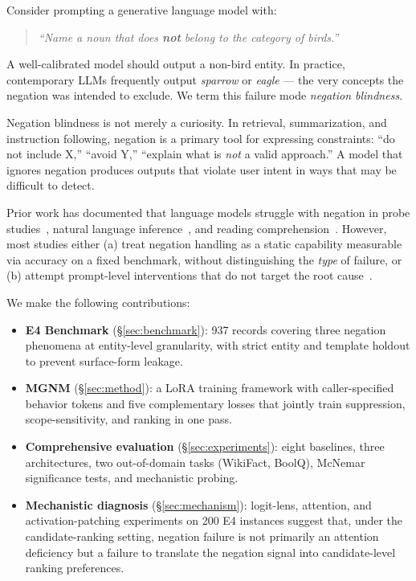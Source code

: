 \documentclass[letterpaper]{article}
\begin{document}
Consider prompting a generative language model with:
\begin{quote}
  \emph{``Name a noun that does \textbf{not} belong to the category of birds.''}
\end{quote}
A well-calibrated model should output a non-bird entity.
In practice, contemporary LLMs frequently output
\emph{sparrow} or \emph{eagle} --- the very concepts the negation was intended
to exclude.
We term this failure mode \emph{negation blindness}.

Negation blindness is not merely a curiosity.
In retrieval, summarization, and instruction following, negation is a
primary tool for expressing constraints: ``do not include X,''
``avoid Y,'' ``explain what is \emph{not} a valid approach.''
A model that ignores negation produces outputs that violate user intent in
ways that may be difficult to detect.

Prior work has documented that language models struggle with negation in
probe studies~\cite{kassner2020negated,ettinger2020bert},
natural language inference~\cite{hossain2020analysis}, and
reading comprehension~\cite{ravichander2022condaqa}.
However, most studies either (a) treat negation handling as a static
capability measurable via accuracy on a fixed benchmark, without
distinguishing the \emph{type} of failure, or (b) attempt prompt-level
interventions that do not target the root cause~\cite{jang2023negation}.

We make the following contributions:

\begin{itemize}
\item \textbf{E4 Benchmark} (\S\ref{sec:benchmark}): 937 records covering
  three negation phenomena at entity-level granularity, with
  strict entity and template holdout to prevent surface-form leakage.
\item \textbf{MGNM} (\S\ref{sec:method}): a LoRA training framework with
  caller-specified behavior tokens and five complementary losses that jointly
  train suppression, scope-sensitivity, and ranking in one pass.
\item \textbf{Comprehensive evaluation} (\S\ref{sec:experiments}): eight
  baselines, three architectures, two out-of-domain tasks (WikiFact, BoolQ),
  McNemar significance tests, and mechanistic probing.
\item \textbf{Mechanistic diagnosis} (\S\ref{sec:mechanism}): logit-lens,
  attention, and activation-patching experiments on 200 E4 instances suggest that,
  under the candidate-ranking setting, negation failure is not primarily an
  attention deficiency but a failure to translate the negation signal into
  candidate-level ranking preferences.
\end{itemize}
\end{document}
